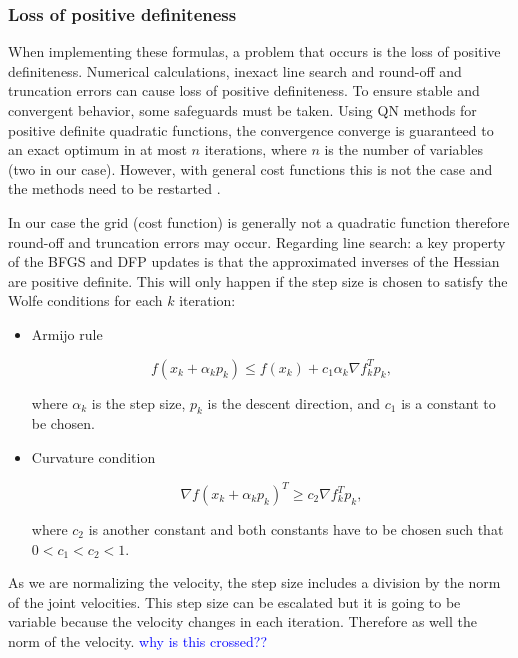 \subsubsection{Loss of positive definiteness}
\label{subsubsec:loss_pdness}

When implementing these formulas, a problem that occurs is the loss of positive definiteness. Numerical calculations, inexact line search and round-off and truncation errors can cause loss of positive definiteness. To ensure stable and convergent behavior, some safeguards must be taken. 
Using QN methods for positive definite quadratic functions, the convergence converge is guaranteed to an exact optimum in at most $n$ iterations, where $n$ is the number of variables (two in our case).
However, with general cost functions this is not the case and the methods need to be restarted   \cite{intro_opt_design}.


In our case the grid (cost function) is generally not a quadratic function therefore round-off and truncation errors may occur. 
Regarding line search: a key property of the BFGS and DFP updates is that the approximated inverses of the Hessian are positive definite. This will only happen if the step size is chosen to satisfy the Wolfe conditions for each $k$ iteration:


\begin{itemize}
	\item Armijo rule
	
	\begin{equation}
	f(x_k +  \alpha_k p_k) \le f(x_k) + c_1 \alpha_k \nabla f_k^{T} p_k ,
 	\end{equation}
	
	where $\alpha_k $ is the step size, $p_k$ is the descent direction, and $c_1$ is a constant to be chosen.
	
	\item Curvature condition
	
	\begin{equation}
	\nabla f(x_k + \alpha_k p_k)^{T} \ge  c_2 \nabla f_k^{T} p_k  ,
	\end{equation}	
	
	where $c_2$ is another constant and both constants have to be chosen such that $ 0 < c_1 < c_2 < 1 $.
	
	
\end{itemize}





As we are normalizing the velocity, the step size includes a division by the norm of the joint velocities. This step size can be escalated but it is going to be variable because the velocity changes in each iteration. Therefore as well the norm of the velocity. 	\textcolor{blue}{why is this crossed?? }

